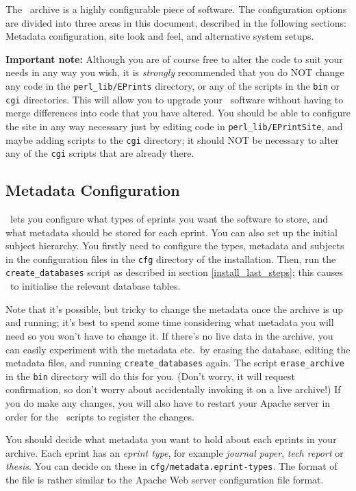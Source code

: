 The \eprints\ archive is a highly configurable piece of software. The configuration options are divided into three areas in this document, described in the following sections: Metadata configuration, site look and feel, and alternative system setups.

{\bf Important note:} Although you are of course free to alter the code to suit your needs in any way you wish, it is \emph{strongly} recommended that you do NOT change any code in the {\tt perl\_lib/EPrints} directory, or any of the scripts in the {\tt bin} or {\tt cgi} directories. This will allow you to upgrade your \eprints\ software without having to merge differences into code that you have altered. You should be able to configure the site in any way necessary just by editing code in {\tt perl\_lib/EPrintSite}, and maybe adding scripts to the {\tt cgi} directory; it should NOT be necessary to alter any of the {\tt cgi} scripts that are already there.


\subsection{Metadata Configuration}
\label{install_metadata}

\eprints\ lets you configure what types of eprints you want the software to store, and what metadata should be stored for each eprint. You can also set up the initial subject hierarchy. You firstly need to configure the types, metadata and subjects in the configuration files in the {\tt cfg} directory of the installation. Then, run the {\tt create\_databases} script as described in section \ref{install_last_steps}; this causes \eprints\ to initialise the relevant database tables.

Note that it's possible, but tricky to change the metadata once the archive is up and running; it's best to spend some time considering what metadata you will need so you won't have to change it. If there's no live data in the archive, you can easily experiment with the metadata etc.\ by erasing the database, editing the metadata files, and running {\tt create\_databases} again. The script {\tt erase\_archive} in the {\tt bin} directory will do this for you. (Don't worry, it will request confirmation, so don't worry about accidentally invoking it on a live archive!) If you do make any changes, you will also have to restart your Apache server in order for the \eprints\ scripts to register the changes.

You should decide what metadata you want to hold about each eprints in your archive. Each eprint has an \emph{eprint type}, for example \emph{journal paper}, \emph{tech report} or \emph{thesis}. You can decide on these in {\tt cfg/metadata.eprint-types}. The format of the file is rather similar to the Apache Web server configuration file format.

